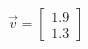 \documentclass[preview]{standalone}
\begin{document}
\begin{align*}
\vec{v}=\begin{bmatrix}1.9\\1.3\end{bmatrix}
\end{align*}
\end{document}
